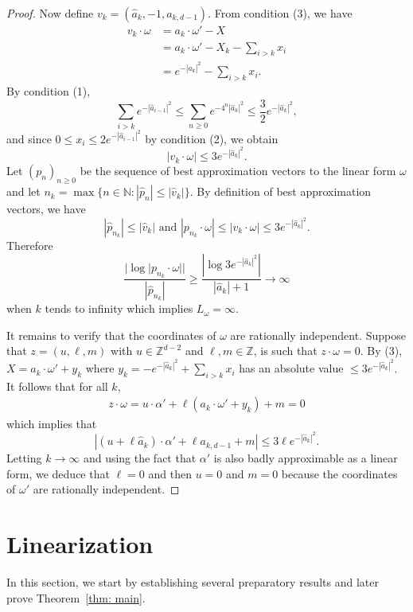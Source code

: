 \documentclass[12pt,reqno,a4paper]{amsart}%
\numberwithin{equation}{section}
\newcommand{\Nn}{{\mathbb{N}}}
\newcommand{\Zz}{{\mathbb{Z}}}
\begin{document}
\begin{proof}
		 Now define $v_k=(\hat a_k,-1,a_{k,d-1})$. From condition (3), we have
		 \begin{align*}
		 v_k\cdot\omega&=a_k\cdot\omega'-X\\
		 &=a_k\cdot\omega'-X_{k}-\sum_{i>k}x_i\\
		 &=e^{-|\hat a_{k}|^2}-\sum_{i>k}x_i.
		 \end{align*}
		 By condition (1), 
		 \[
		 \sum_{i>k}e^{-|\hat a_{i-1}|^2}\le\sum_{n\ge 0}e^{-4^n|\hat a_k|^2}\leq \frac32 e^{-|\hat a_{k}|^2},
		 \]
		  and since $0\leq x_i\leq 2e^{-|\hat a_{i-1}|^2}$ by condition (2), we obtain
		 \[
		 | v_k\cdot\omega|\leq  3e^{-|\hat a_{k}|^2}.
		 \]
Let $(p_n)_{n\ge 0}$ be the sequence of best approximation vectors to the linear form $\omega$ and let
$n_k=\max\{n\in\Nn\colon |\hat p_n|\leq |\hat v_k|\}$. By definition of  best approximation vectors,
		 we have
		 \[
		 |\hat p_{n_k}|\leq |\hat v_k| \text{ and } |p_{n_k}\cdot\omega|\leq |v_k\cdot\omega|\leq  3e^{-|\hat a_{k}|^2}.
		 \]	 Therefore 
		 \[
		 \frac{|\log |p_{n_k}\cdot\omega||}{|\hat p_{n_k}|}\geq\frac{|\log 3e^{-|\hat a_{k}|^2}|}{|\hat a_k|+1}\rightarrow\infty 
		 \]
		 when $k$ tends to infinity which implies $L_{\omega}=\infty$.
		 
		 It remains to verify  that the coordinates of $\omega$ are rationally independent. Suppose that $z=(u,\ell,m)$ with $u\in\Zz^{d-2}$ and $\ell,m\in\Zz$, is such that 
		 $
		 z\cdot\omega=0.
		 $ 
		 By (3), $X=a_k\cdot\omega'+y_k$ where $y_k=-e^{-|\hat a_k|^2}+\sum_{i>k}x_i$ has an absolute value $\leq 3 e^{-|\hat a_k|^2}$. It follows that for all $k$,
		 \begin{align*}
		 	 z\cdot\omega=u\cdot\alpha'+\ell(a_k\cdot\omega'+y_k)+m=0
		 \end{align*}
		 which implies that
		 \[
		 |(u+\ell\hat a_k)\cdot\alpha'+\ell a_{k,d-1}+m|\leq 3\ell e^{-|\hat a_k|^2}.
		 \]
		 Letting $k \to \infty$ and using the fact that $\alpha'$ is also badly approximable as a linear form, we deduce that $\ell=0$ and then $u=0$ and $m=0$ because the coordinates of $\omega'$ are rationally independent. 
	\end{proof}





\section{Linearization}

In this section, we start by establishing several preparatory results and later prove Theorem~\ref{thm: main}.
\end{document}
